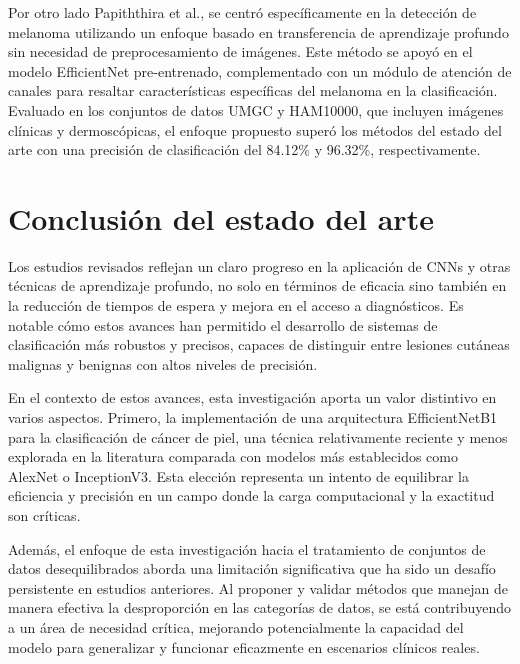 Por otro lado Papiththira et al.,  se centró específicamente en la detección de melanoma utilizando un enfoque basado en transferencia de aprendizaje profundo sin necesidad de preprocesamiento de imágenes. Este método se apoyó en el modelo EfficientNet pre-entrenado, complementado con un módulo de atención de canales para resaltar características específicas del melanoma en la clasificación. Evaluado en los conjuntos de datos UMGC y HAM10000, que incluyen imágenes clínicas y dermoscópicas, el enfoque propuesto superó los métodos del estado del arte con una precisión de clasificación del 84.12\% y 96.32\%, respectivamente.

\section{Conclusión del estado del arte}

Los estudios revisados reflejan un claro progreso en la aplicación de CNNs y otras técnicas de aprendizaje profundo, no solo en términos de eficacia sino también en la reducción de tiempos de espera y mejora en el acceso a diagnósticos. Es notable cómo estos avances han permitido el desarrollo de sistemas de clasificación más robustos y precisos, capaces de distinguir entre lesiones cutáneas malignas y benignas con altos niveles de precisión.

En el contexto de estos avances, esta investigación aporta un valor distintivo en varios aspectos. Primero, la implementación de una arquitectura EfficientNetB1 para la clasificación de cáncer de piel, una técnica relativamente reciente y menos explorada en la literatura comparada con modelos más establecidos como AlexNet o InceptionV3. Esta elección representa un intento de equilibrar la eficiencia y precisión en un campo donde la carga computacional y la exactitud son críticas.

Además, el enfoque de esta investigación hacia el tratamiento de conjuntos de datos desequilibrados aborda una limitación significativa que ha sido un desafío persistente en estudios anteriores. Al proponer y validar métodos que manejan de manera efectiva la desproporción en las categorías de datos, se está contribuyendo a un área de necesidad crítica, mejorando potencialmente la capacidad del modelo para generalizar y funcionar eficazmente en escenarios clínicos reales.